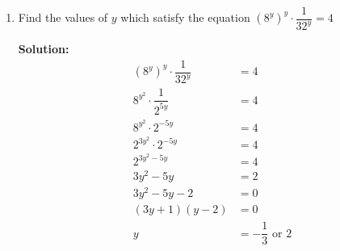 \documentclass{report}
\newcommand{\sol}{\vspace{0.2cm}\textbf{Solution:}\vspace{0.2cm}}
\begin{document}
\begin{multicols*}{2}
\begin{enumerate}[leftmargin=*]
\begin{enumerate}
                        \sol{}
                        \begin{align*}
                            \log_5 x   & = 16 \log_x 5                    \\
                            \log_5 x   & = \dfrac{16}{\log_5 x}           \\
                            \log_5^2 x & = 16                             \\
                            \log_5 x   & = \pm 4                          \\
                            x          & = 5^4 \text{ or } 5^{-4}         \\
                                       & = 625 \text{ or } \dfrac{1}{625}
                        \end{align*}

                  \item Find the values of $y$ which satisfy the equation $\left(8^{y}\right)^{y} \cdot
                            \dfrac{1}{32^{y}}=4$

                        \sol{}
                        \begin{align*}
                            \left(8^y\right)^y \cdot \dfrac{1}{32^y} & = 4                           \\
                            8^{y^2} \cdot \dfrac{1}{2^{5y}}          & = 4                           \\
                            8^{y^2} \cdot 2^{-5y}                    & = 4                           \\
                            2^{3y^2} \cdot 2^{-5y}                   & = 4                           \\
                            2^{3y^2 - 5y}                            & = 4                           \\
                            3y^2 - 5y                                & = 2                           \\
                            3y^2 - 5y - 2                            & = 0                           \\
                            (3y + 1)(y - 2)                          & = 0                           \\
                            y                                        & = -\dfrac{1}{3} \text{ or } 2
                        \end{align*}


\end{enumerate}
\end{enumerate}
\end{multicols*}
\end{document}
